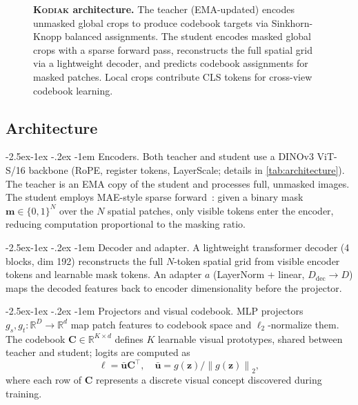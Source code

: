 \documentclass[runningheads]{llncs}
\makeatletter
\newcommand{\method}{\textsc{Kodiak}}
\newcommand{\norm}[1]{\left\lVert #1 \right\rVert}
\renewcommand\paragraph{\@startsection{paragraph}{4}{\z@}%
  {-2.5ex\@plus -1ex \@minus -.2ex}%
  {-1em}%
  {\normalfont\normalsize\bfseries}}
\makeatother
\begin{document}
\begin{figure}[t]
\centering
\resizebox{0.95\textwidth}{!}{}
\caption{\textbf{\method{} architecture.} The teacher (EMA-updated) encodes unmasked global crops to produce codebook targets via Sinkhorn-Knopp balanced assignments. The student encodes masked global crops with a sparse forward pass, reconstructs the full spatial grid via a lightweight decoder, and predicts codebook assignments for masked patches. Local crops contribute CLS tokens for cross-view codebook learning.}
\label{fig:architecture}
\end{figure}

\subsection{Architecture}
\label{sec:architecture}

\paragraph{Encoders.}
Both teacher and student use a DINOv3 ViT-S/16 backbone (RoPE, register tokens, LayerScale; details in \cref{tab:architecture}).
The teacher is an EMA copy of the student and processes full, unmasked images.
The student employs MAE-style sparse forward~\cite{he2022masked}: given a binary mask $\mathbf{m} \in \{0,1\}^N$ over the $N$ spatial patches, only visible tokens enter the encoder, reducing computation proportional to the masking ratio.

\paragraph{Decoder and adapter.}
A lightweight transformer decoder (4 blocks, dim 192) reconstructs the full $N$-token spatial grid from visible encoder tokens and learnable mask tokens.
An adapter $a$ (LayerNorm + linear, $D_{\text{dec}} {\to} D$) maps the decoded features back to encoder dimensionality before the projector.

\paragraph{Projectors and visual codebook.}
MLP projectors $g_s, g_t: \mathbb{R}^D \to \mathbb{R}^d$ map patch features to codebook space and $\ell_2$-normalize them.
The codebook $\mathbf{C} \in \mathbb{R}^{K \times d}$ defines $K$ learnable visual prototypes, shared between teacher and student; logits are computed as
\begin{equation}
    \boldsymbol{\ell} = \bar{\mathbf{u}} \mathbf{C}^\top,
    \quad
    \bar{\mathbf{u}} = g(\mathbf{z}) / \norm{g(\mathbf{z})}_2,
\end{equation}
where each row of $\mathbf{C}$ represents a discrete visual concept discovered during training.
\end{document}

